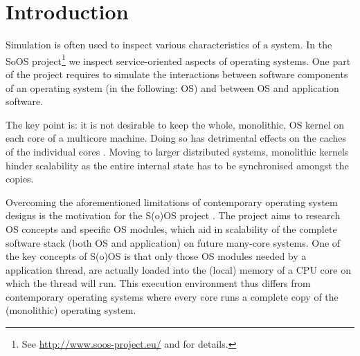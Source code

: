 \section{Introduction}

Simulation is often used to inspect various characteristics of a system.
In the SoOS project\footnote{See \url{http://www.soos-project.eu/} and \cite{soos} for details.} we inspect service-oriented aspects of operating systems.
One part of the project requires to simulate the interactions between software components of an operating system (in the following: OS) and between
OS and application software.

The key point is: it is not desirable to keep the whole, monolithic, OS kernel on each core of a multicore machine.
Doing so has detrimental effects on the caches of the individual cores .
Moving to larger distributed systems, monolithic kernels hinder scalability as the entire internal state has to be synchronised amongst the copies.

Overcoming the aforementioned limitations of contemporary operating system designs is the motivation for the S(o)OS project \cite{soos}.
The project aims to research OS concepts and specific OS modules, which aid in scalability of the complete software stack (both OS and application) on future many-core systems.
One of the key concepts of S(o)OS is that only those OS modules needed by a application thread, are actually loaded into the (local) memory of a CPU core on which the thread will run.
This execution environment thus differs from contemporary operating systems where every core runs a complete copy of the (monolithic) operating system.

